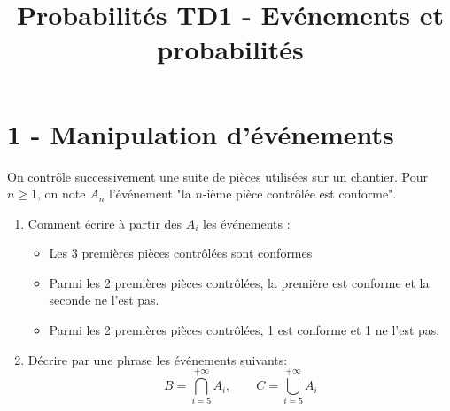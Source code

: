 

\title{Probabilités TD1 - Evénements et probabilités}

\author{}
\date{}


\sffamily
\maketitle

\section*{1 - Manipulation d'événements}
On contrôle successivement une suite de pièces utilisées sur un chantier. Pour $n \geq 1$, on note $A_n$ l'événement "la $n$-ième pièce contrôlée est conforme".
\begin{enumerate}
    \item Comment écrire à partir des $A_i$ les événements :
    \begin{itemize}
        \item Les 3 premières pièces contrôlées sont conformes
        \item Parmi les 2 premières pièces contrôlées, la première est conforme et la seconde ne l'est pas.
        \item Parmi les 2 premières pièces contrôlées, 1 est conforme et 1 ne l'est pas.
    \end{itemize}

    \item Décrire par une phrase les événements suivants:
    $$
B=\bigcap_{i=5}^{+\infty} A_i,\qquad  C=\bigcup_{i=5}^{+\infty} A_i
$$



\end{enumerate}

